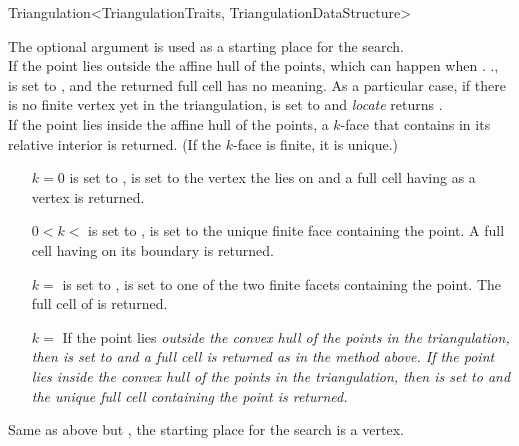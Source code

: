 \begin{ccRefClass}{Triangulation<TriangulationTraits, TriangulationDataStructure>}
{The optional argument  is used as a starting place for the
search.\\ If the  point lies outside the affine hull of the points,
which can happen when \ccVar.
\ccVar.,  is set to
, and the returned full cell has no meaning. As a
particular case, if there is no finite vertex yet in the triangulation,
 is set to  and \textit{locate} returns
.\\ If the  point lies inside the affine hull
of the points, a $k$-face that contains  {in its relative
interior} is returned. (If the $k$-face is finite, it is
unique.)\begin{itemize} \item[$k=0$]  is set to ,
 is set to the vertex  the  lies on and a full cell
having  as a vertex is returned.
\item[$0<k<$\ccc{c.current_dimension()-1}]  is set to
,  is set to the unique finite face containing the
 point. A full cell having  on its boundary is returned.
\item[$k=$\ccc{c.current_dimension()-1}]  is set to
,  is set to one of the two finite facets containing the
 point. The full cell of  is returned.
\item[$k=$\ccc{c.current_dimension()}] If the  point lies
\em{outside} the convex hull of the points in the triangulation, then
 is set to  and a full cell is returned
as in the  method above. If the  point lies
\em{inside} the convex hull of the points in the triangulation, then
 is set to  and the unique full cell containing
the  point is returned. \end{itemize}}

{Same as above but , the starting place for the search is a vertex.}



\end{ccRefClass}
